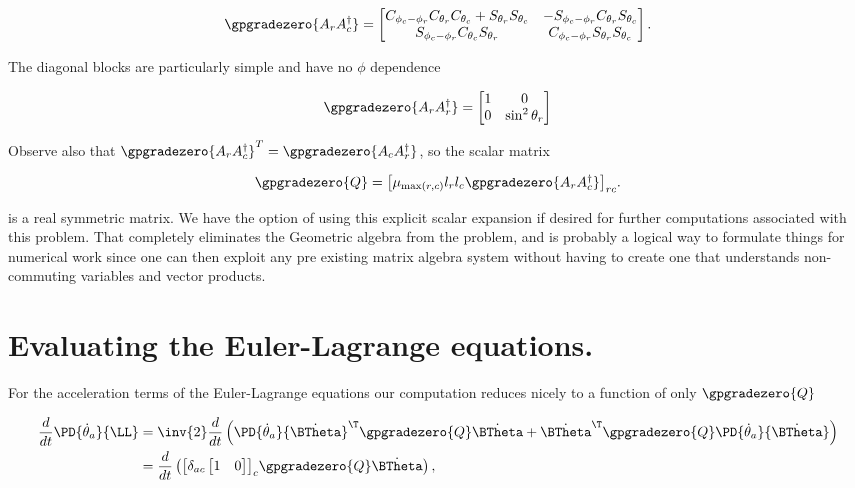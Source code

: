 \begin{align}\label{eqn:sPolarArxiv:boo20}
\gpgradezero{A_r A_c^\dagger}
=
\begin{bmatrix}
C_{\phi_c - \phi_r} 
C_{\theta_r}
C_{\theta_c}
+S_{\theta_r}
S_{\theta_c} &
-S_{\phi_c - \phi_r} C_{\theta_r} S_{\theta_c} \\
S_{\phi_c - \phi_r} C_{\theta_c} S_{\theta_r} &
C_{\phi_c - \phi_r} S_{\theta_r} S_{\theta_c}
\end{bmatrix}.
\end{align}

The diagonal blocks are particularly simple and have no $\phi$ dependence

\begin{align}\label{eqn:sPolarArxiv:boo20d}
\gpgradezero{A_r A_r^\dagger}
=
\begin{bmatrix}
1 & 0 \\
0 & \sin^2 \theta_r
\end{bmatrix}
\end{align}

Observe also that $\gpgradezero{A_r A_c^\dagger}^T = \gpgradezero{A_c A_r^\dagger}$, so the scalar matrix

\begin{align}\label{eqn:sPolarArxiv:boo21}
\gpgradezero{Q} = 
{\begin{bmatrix}
\mu_{\max(r,c)} l_r l_c \gpgradezero{ A_r A_c^\dagger }
\end{bmatrix}}_{rc}.
\end{align}

is a real symmetric matrix.  We have the option of using this explicit scalar expansion if desired for further computations associated with this problem.  That completely eliminates the Geometric algebra from the problem, and is probably a logical way to formulate things for numerical work since one can then exploit any pre existing matrix algebra system without having to create one that understands non-commuting variables and vector products.

\section{Evaluating the Euler-Lagrange equations.}

For the acceleration terms of the Euler-Lagrange equations our computation reduces nicely to a function of only $\gpgradezero{Q}$

\begin{align*}
\frac{d}{dt} \PD{\dot{\theta}_a}{\LL}
&=
\inv{2} \frac{d}{dt} 
\left(
\PD{\dot{\theta}_a}{\dot{\BTheta}}^\T
\gpgradezero{Q} 
\dot{\BTheta}
+
\dot{\BTheta}^\T
\gpgradezero{Q} 
\PD{\dot{\theta}_a}{\dot{\BTheta}}
\right)  \\
&=
\frac{d}{dt} \left(
{\begin{bmatrix}
\delta_{ac}
\begin{bmatrix}
1 & 0
\end{bmatrix}
\end{bmatrix}}_c
\gpgradezero{Q} 
\dot{\BTheta}
\right),
\end{align*}

